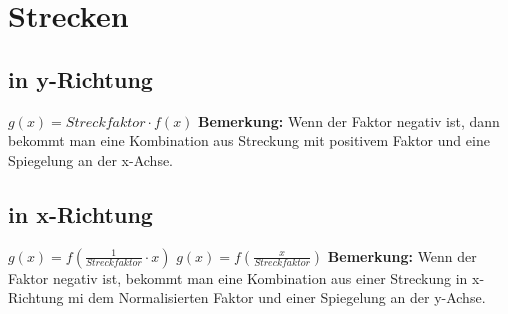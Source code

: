 \documentclass{article}
\begin{document}
\section*{Strecken}

\subsection*{in y-Richtung}

$g(x) = Streckfaktor \cdot f(x)$
\newline
\textbf{Bemerkung:} Wenn der Faktor negativ ist,  dann bekommt man eine Kombination aus Streckung mit positivem Faktor und eine Spiegelung an der x-Achse.

\subsection*{in x-Richtung}

$g(x) = f(\frac{1} {Streckfaktor} \cdot x)$
\newline
$g(x) = f(\frac{x} {Streckfaktor})$
\newline
\textbf{Bemerkung:} Wenn der Faktor negativ ist, bekommt man eine Kombination aus einer Streckung in x-Richtung mi dem Normalisierten Faktor und einer Spiegelung an der y-Achse.
\end{document}
